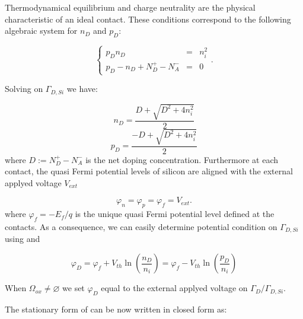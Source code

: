 Thermodynamical equilibrium and charge neutrality are the physical characteristic of an ideal contact. These conditions correspond to the following algebraic system for $n_D$ and $p_D$:

\begin{equation}
\label{eq: systemo for dirichlet condition}
\left\{
\begin{array}{lcl}
p_Dn_D & = &n_i^2 \\
p_D -n_D +N_D^+-N_A^- & = & 0 
\end{array}
\right. .
\end{equation}

Solving  on $\Gamma_{D,Si}$ we have:

\begin{equation}
n_D = \dfrac{D + \sqrt{D^2+4n_i^2}}{2}
\end{equation}
\begin{equation}
p_D = \dfrac{-D + \sqrt{D^2+4n_i^2}}{2}
\end{equation}
where $D := N_D^+ -N_A^-$ is the net doping concentration. Furthermore  at each contact, the quasi Fermi potential levels of silicon are aligned with the external applyed voltage $V_{ext}$

\begin{equation}
\varphi_n=\varphi_p=\varphi_f=V_{ext}.
\end{equation}
where $\varphi_f = - E_f / q$ is the unique quasi Fermi potential level defined at the contacts.
As a consequence, we can easily determine potential condition on $\Gamma_{D,Si}$ using  and 

\begin{equation}
\varphi_D = \varphi_f + V_{th}\ln\left( \dfrac{n_D}{n_i} \right) = \varphi_f - V_{th}\ln\left( \dfrac{p_D}{n_i} \right)
\end{equation}

 When $\Omega_{ox} \neq \varnothing$ we set $\varphi_D$ equal to the external applyed voltage on $\Gamma_D / \Gamma_{D,Si}$.


The stationary form of  can be now written in closed form as:
 

